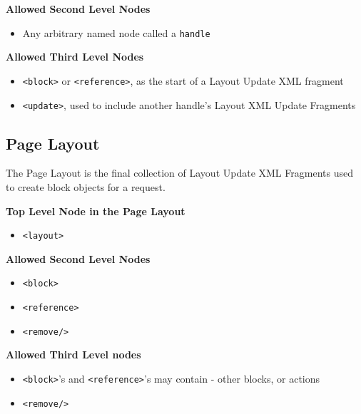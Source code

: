 \documentclass[oneside]{book}
\begin{document}
\textbf{Allowed Second Level Nodes}

\begin{itemize}
\item Any arbitrary named node called a \footnotesize\texttt{handle} \normalsize 
\end{itemize}


\textbf{Allowed Third Level Nodes}

\begin{itemize}
\item \footnotesize\texttt{\textless block\textgreater } \normalsize  or \footnotesize\texttt{\textless reference\textgreater }\normalsize, as the start of a Layout Update XML fragment
\item \footnotesize\texttt{\textless update\textgreater }\normalsize, used to include another handle's Layout XML Update Fragments
\end{itemize}


\subsection{Page Layout}

The Page Layout is the final collection of Layout Update XML Fragments used to create block objects for a request.

\textbf{Top Level Node in the Page Layout}

\begin{itemize}
\item \footnotesize\texttt{\textless layout\textgreater } \normalsize 
\end{itemize}


\textbf{Allowed Second Level Nodes}

\begin{itemize}
\item \footnotesize\texttt{\textless block\textgreater } \normalsize         
\item \footnotesize\texttt{\textless reference\textgreater } \normalsize 
\item \footnotesize\texttt{\textless remove/\textgreater } \normalsize 
\end{itemize}


\textbf{Allowed Third Level nodes}

\begin{itemize}
\item \footnotesize\texttt{\textless block\textgreater }\normalsize's and \footnotesize\texttt{\textless reference\textgreater }\normalsize's may contain - other blocks, or actions
\item \footnotesize\texttt{\textless remove/\textgreater } \normalsize 
\end{itemize}
\end{document}
